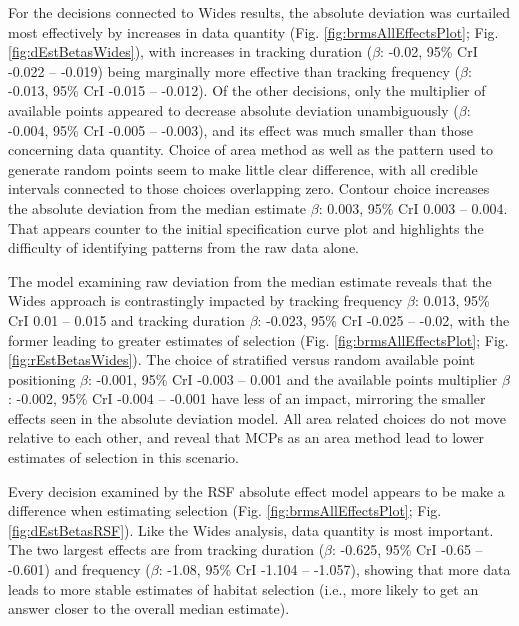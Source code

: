 \documentclass[10pt,a4paper]{article}
\begin{document}
For the decisions connected to Wides results, the absolute deviation was curtailed most effectively by increases in data quantity (Fig. \ref{fig:brmsAllEffectsPlot}; Fig. \ref{fig:dEstBetasWides}), with increases in tracking duration (\(\beta\): -0.02, 95\% CrI -0.022 -- -0.019) being marginally more effective than tracking frequency (\(\beta\): -0.013, 95\% CrI -0.015 -- -0.012).
Of the other decisions, only the multiplier of available points appeared to decrease absolute deviation unambiguously (\(\beta\): -0.004, 95\% CrI -0.005 -- -0.003), and its effect was much smaller than those concerning data quantity.
Choice of area method as well as the pattern used to generate random points seem to make little clear difference, with all credible intervals connected to those choices overlapping zero.
Contour choice increases the absolute deviation from the median estimate \(\beta\): 0.003, 95\% CrI 0.003 -- 0.004.
That appears counter to the initial specification curve plot and highlights the difficulty of identifying patterns from the raw data alone.

The model examining raw deviation from the median estimate reveals that the Wides approach is contrastingly impacted by tracking frequency \(\beta\): 0.013, 95\% CrI 0.01 -- 0.015 and tracking duration \(\beta\): -0.023, 95\% CrI -0.025 -- -0.02, with the former leading to greater estimates of selection (Fig. \ref{fig:brmsAllEffectsPlot}; Fig. \ref{fig:rEstBetasWides}).
The choice of stratified versus random available point positioning \(\beta\): -0.001, 95\% CrI -0.003 -- 0.001 and the available points multiplier \(\beta\): -0.002, 95\% CrI -0.004 -- -0.001 have less of an impact, mirroring the smaller effects seen in the absolute deviation model.
All area related choices do not move relative to each other, and reveal that MCPs as an area method lead to lower estimates of selection in this scenario.

Every decision examined by the RSF absolute effect model appears to be make a difference when estimating selection (Fig. \ref{fig:brmsAllEffectsPlot}; Fig. \ref{fig:dEstBetasRSF}).
Like the Wides analysis, data quantity is most important.
The two largest effects are from tracking duration (\(\beta\): -0.625, 95\% CrI -0.65 -- -0.601) and frequency (\(\beta\): -1.08, 95\% CrI -1.104 -- -1.057), showing that more data leads to more stable estimates of habitat selection (i.e., more likely to get an answer closer to the overall median estimate).
\end{document}
